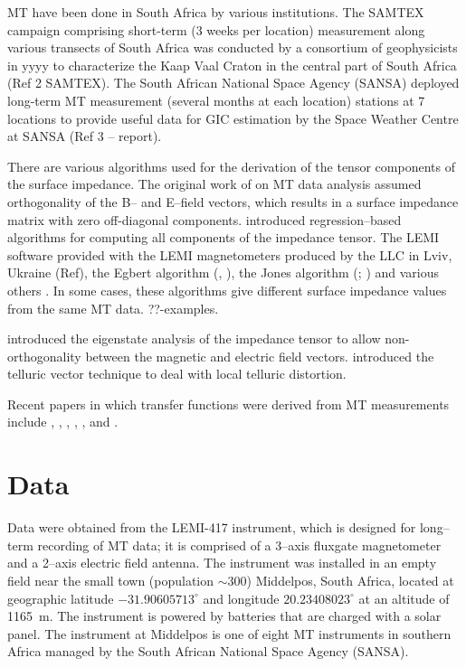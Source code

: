 \documentclass[draft,linenumbers]{agujournal2018}
\begin{document}
MT have been done in South Africa by various institutions. The SAMTEX campaign comprising short-term (3 weeks per location) measurement along various transects of South Africa was conducted by a consortium of geophysicists in yyyy to characterize the Kaap Vaal Craton in the central part of South Africa (Ref 2 SAMTEX). The South African National Space Agency (SANSA) deployed long-term MT measurement (several months at each location) stations at 7 locations to provide useful data for GIC estimation by the Space Weather Centre at SANSA  (Ref 3 – report).

There are various algorithms used for the derivation of the tensor components of the surface impedance. The original work of \cite{Cagniard1953} on MT data analysis assumed orthogonality of the B-- and E--field vectors, which results in a surface impedance matrix with zero off-diagonal components. \cite{Sims1971} introduced regression--based algorithms for computing all components of the impedance tensor. The LEMI software provided with the LEMI magnetometers produced by the LLC in Lviv, Ukraine (Ref), the Egbert algorithm (\cite{Egbert1997}, \cite{Egbert2011}), the Jones algorithm (\cite{Jones1989}; \cite{Chave2012}) and various others \cite{Larsen1996}. In some cases, these algorithms give different surface impedance values from the same MT data. ??-examples. 

\cite{Eggers1982} introduced the eigenstate analysis of
the impedance tensor to allow non-orthogonality between the magnetic and electric field vectors. \cite{Bahr1988} introduced the telluric vector technique to deal with local telluric distortion.

Recent papers in which transfer functions were derived from MT measurements include \cite{Jones1989}, \cite{Moorkamp2007}, \cite{Fujii2015},  \cite{Heyns2020}, \cite{Weigel2019}, and \cite{Chen2021}.

\section{Data}
\label{section:Data}

Data were obtained from the LEMI-417 instrument, which is designed for long--term recording of MT data; it is comprised of a 3--axis fluxgate magnetometer and a 2--axis electric field antenna. The instrument was installed in an empty field near the small town (population $\sim$300) Middelpos, South Africa, located at geographic latitude $-31.90605713^\circ$ and longitude $20.23408023^\circ$ at an altitude of 1165~m. The instrument is powered by batteries that are charged with a solar panel. The instrument at Middelpos is one of eight MT instruments in southern Africa managed by the South African National Space Agency (SANSA).
\end{document}
